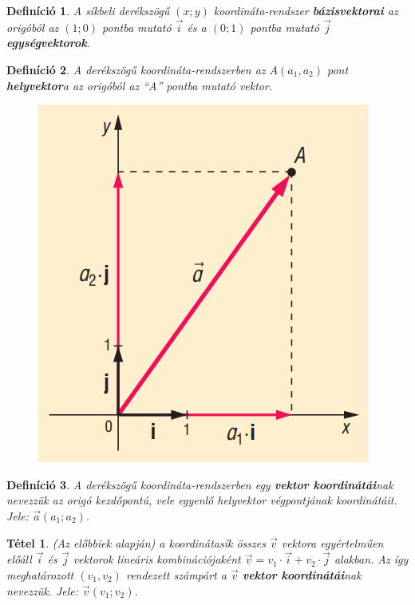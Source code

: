 \documentclass[12pt,a4paper]{article}
\newtheorem{theorem}{Tétel} [section]
\newtheorem{definition}{Definíció} [section]
\begin{document}
\begin{definition}
A síkbeli derékszögű $(x; y)$ koordináta-rendszer \textbf{bázisvektorai} az origóból az $(1; 0)$ pontba mutató $\vec{i}$ és a $(0; 1)$ pontba mutató $\vec{j}$ \textbf{egységvektorok}.
\end{definition}
\newpage
\begin{definition}
A derékszögű koordináta-rendszerben az $A(a_1, a_2)$ pont \textbf{helyvektor}a az origóból az ``A'' pontba mutató vektor.
\begin{figure}[h!]
\centering
\includegraphics[scale=0.3]{geometry/helyvektor}
\end{figure}
\end{definition}

\begin{definition}
A derékszögű koordináta-rendszerben egy \textbf{vektor koordinátái}nak nevezzük az origó kezdőpontú, vele egyenlő helyvektor végpontjának koordinátáit. Jele: $\vec{a}(a_1;a_2)$.
\end{definition}

\begin{theorem}
(Az előbbiek alapján) a koordinátasík összes $\vec{v}$ vektora egyértelműen előáll $\vec{i}$ és $\vec{j}$ vektorok lineáris kombinációjaként $\vec{v}=v_1\cdot\vec{i}+v_2\cdot\vec{j}$ alakban. Az így meghatározott $(v_1, v_2)$ rendezett számpárt a $\vec{v}$ \textbf{vektor koordinátái}nak nevezzük. Jele: $\vec{v}(v_1;v_2)$.
\end{theorem}
\end{document}
